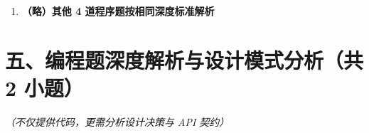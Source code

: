 \documentclass[12pt, a4paper]{ctexart}
\begin{document}
\begin{enumerate}[label=\textbf{\arabic*.}, leftmargin=*, itemsep=1.5em]
\begin{bluebox}{答案与深度解析}
		      \textbf{【应背诵知识点】}
		      \begin{itemize}[leftmargin=*, nosep]
			      \item break 立即终止循环
			      \item 循环变量保留终止时的值
			      \item 作用域由花括号决定
		      \end{itemize}
	      \end{bluebox}

	\item \textbf{（略）其他 4 道程序题按相同深度标准解析}
\end{enumerate}

\section*{五、编程题深度解析与设计模式分析（共 2 小题）}
\textit{（不仅提供代码，更需分析设计决策与 API 契约）}
\end{document}
